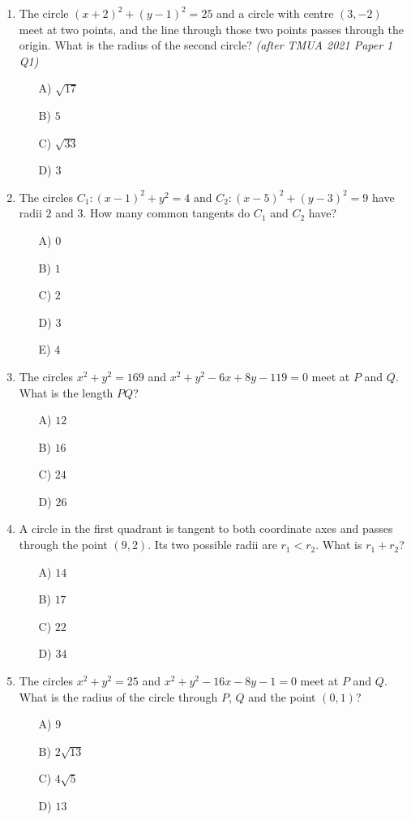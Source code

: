 \documentclass[11pt,a4paper]{article}
\begin{document}
\begin{enumerate}

\item The circle $(x+2)^2+(y-1)^2=25$ and a circle with centre $(3,-2)$ meet at two points, and the line through those two points passes through the origin. What is the radius of the second circle? \textit{\small(after TMUA 2021 Paper 1 Q1)}
\begin{itemize}
\item[A)] $\sqrt{17}$
\item[B)] $5$
\item[C)] $\sqrt{33}$
\item[D)] $3$
\end{itemize}

\item The circles $C_1:(x-1)^2+y^2=4$ and $C_2:(x-5)^2+(y-3)^2=9$ have radii $2$ and $3$. How many common tangents do $C_1$ and $C_2$ have?
\begin{itemize}
\item[A)] $0$
\item[B)] $1$
\item[C)] $2$
\item[D)] $3$
\item[E)] $4$
\end{itemize}

\item The circles $x^2+y^2=169$ and $x^2+y^2-6x+8y-119=0$ meet at $P$ and $Q$. What is the length $PQ$?
\begin{itemize}
\item[A)] $12$
\item[B)] $16$
\item[C)] $24$
\item[D)] $26$
\end{itemize}

\item A circle in the first quadrant is tangent to both coordinate axes and passes through the point $(9,2)$. Its two possible radii are $r_1<r_2$. What is $r_1+r_2$?
\begin{itemize}
\item[A)] $14$
\item[B)] $17$
\item[C)] $22$
\item[D)] $34$
\end{itemize}

\item The circles $x^2+y^2=25$ and $x^2+y^2-16x-8y-1=0$ meet at $P$ and $Q$. What is the radius of the circle through $P$, $Q$ and the point $(0,1)$?
\begin{itemize}
\item[A)] $9$
\item[B)] $2\sqrt{13}$
\item[C)] $4\sqrt5$
\item[D)] $13$
\end{itemize}


\end{enumerate}
\end{document}
